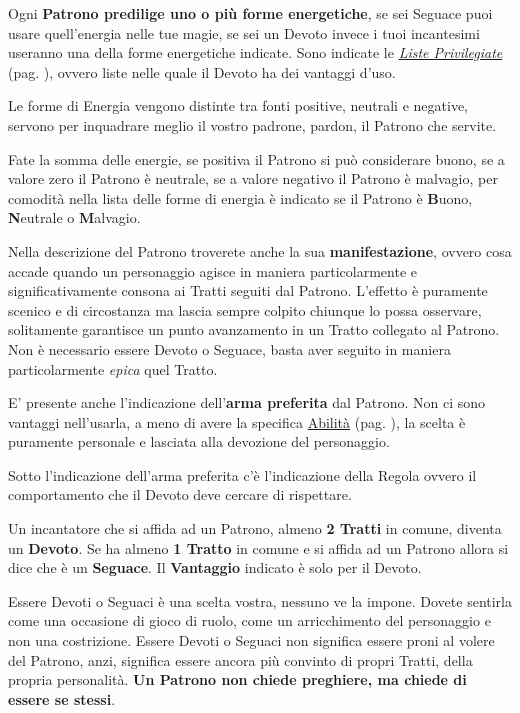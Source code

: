 \begin{multicols}{2}
Ogni \textbf{Patrono predilige uno o più forme energetiche}, se sei Seguace puoi usare quell'energia nelle tue magie, se sei un Devoto invece i tuoi incantesimi useranno una della forme energetiche indicate. Sono indicate le \hyperlink{listeprivilegiate}{\emph{Liste Privilegiate}} (pag. \pageref{listeprivilegiate}), ovvero liste nelle quale il Devoto ha dei vantaggi d'uso.

Le forme di Energia vengono distinte tra fonti positive, neutrali e negative, servono per inquadrare meglio il vostro padrone, pardon, il Patrono che servite.

Fate la somma delle energie, se positiva il Patrono si può considerare buono, se a valore zero il Patrono è neutrale, se a valore negativo il Patrono è malvagio, per comodità nella lista delle forme di energia è indicato se il Patrono è \textbf{B}uono, \textbf{N}eutrale o \textbf{M}alvagio.

Nella descrizione del Patrono troverete anche la sua \textbf{manifestazione}, ovvero cosa accade quando un personaggio agisce in maniera particolarmente e significativamente consona ai Tratti seguiti dal Patrono. L'effetto è puramente scenico e di circostanza ma lascia sempre colpito chiunque lo possa osservare, solitamente garantisce un punto avanzamento in un Tratto collegato al Patrono. Non è necessario essere Devoto o Seguace, basta aver seguito in maniera particolarmente \emph{epica} quel Tratto.

E' presente anche l'indicazione dell'\textbf{arma preferita} dal Patrono. Non ci sono vantaggi nell'usarla, a meno di avere la specifica \hyperlink{Il Patrono è la mia Arma}{Abilità} (pag. \pageref{Il Patrono è la mia Arma}), la scelta è puramente personale e lasciata alla devozione del personaggio.

Sotto l'indicazione dell'arma preferita c'è l'indicazione della Regola  ovvero il comportamento che il Devoto deve cercare di rispettare.

Un incantatore che si affida ad un Patrono, almeno \textbf{2 Tratti} in comune, diventa un \textbf{Devoto}. Se ha almeno \textbf{1 Tratto} in comune e si affida ad un Patrono allora si dice che è un \textbf{Seguace}. Il \textbf{Vantaggio} indicato è solo per il Devoto.

\begin{giocatore}
Essere Devoti o Seguaci è una scelta vostra, nessuno ve la impone. Dovete sentirla come una occasione di gioco di ruolo, come un arricchimento del personaggio e non una costrizione. Essere Devoti o Seguaci non significa essere proni al volere del Patrono, anzi, significa essere ancora più convinto di propri Tratti, della propria personalità. \textbf{Un Patrono non chiede preghiere, ma chiede di essere se stessi}.
\end{giocatore}


\end{multicols}

